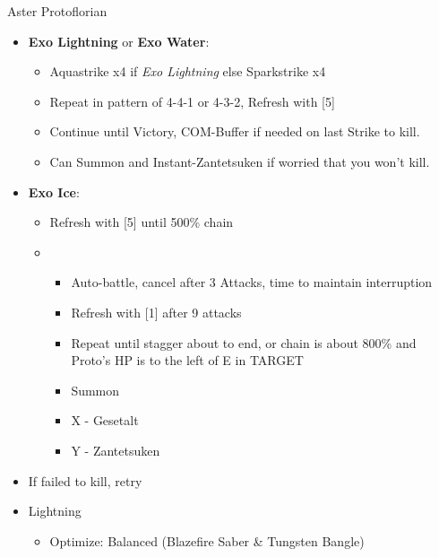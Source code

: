 \begin{battle}{Aster Protoflorian}
\begin{multicols}{2}
\begin{itemize}
\begin{itemize}
        \item \stagger
     \end{itemize}
      \item \textbf{Exo Lightning} or \textbf{Exo Water}:
        \begin{itemize}
            \item Aquastrike x4 if \textit{Exo Lightning} else Sparkstrike x4
            \item Repeat in pattern of 4-4-1 or 4-3-2, Refresh with [5]
            \item Continue until Victory, COM-Buffer if needed on last Strike to kill.
            \item Can Summon and Instant-Zantetsuken if worried that you won't kill.
        \end{itemize}
        \item \textbf{Exo Ice}:
        \begin{itemize}
            \item Refresh with [5] until 500\% chain
            \item \sixth
            \begin{itemize}
                \item Auto-battle, cancel after 3 Attacks, time to maintain interruption
                \item Refresh with [1] after 9 attacks
                \item Repeat until stagger about to end, or chain is about 800\% and Proto's HP is to the left of E in TARGET
                \item Summon
                \item X - Gesetalt
                \item Y - Zantetsuken
            \end{itemize}
    \end{itemize}
    \item If failed to kill, retry
\end{itemize}
\end{multicols}
\end{battle}
\begin{multicols}{2}
\begin{menu}
    \begin{itemize}
        \equip
        \begin{itemize}
            \item Lightning
            \begin{itemize}
            		\item Optimize: Balanced (Blazefire Saber \& Tungsten Bangle)
            \end{itemize}
        \end{itemize}
    \end{itemize}
\end{menu}

\vfill
\end{multicols}
